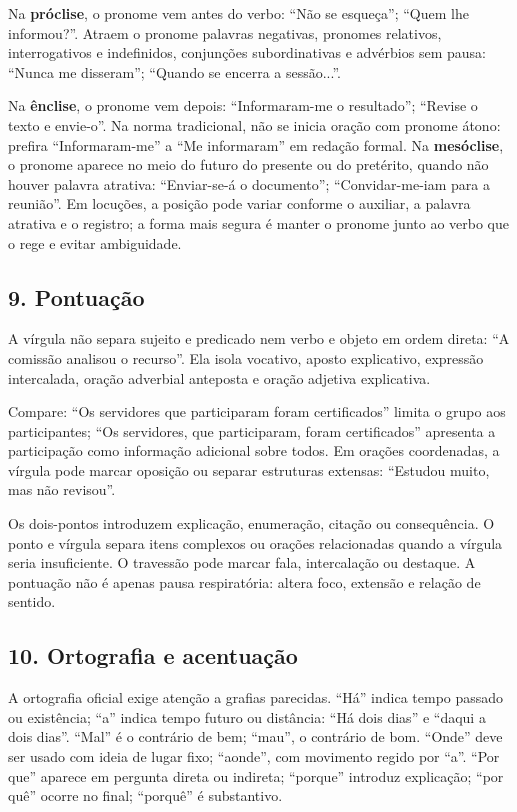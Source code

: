 \documentclass[11pt,a4paper]{article}
\begin{document}
Na \textbf{próclise}, o pronome vem antes do verbo: “Não se esqueça”; “Quem lhe informou?”. Atraem o pronome palavras negativas, pronomes relativos, interrogativos e indefinidos, conjunções subordinativas e advérbios sem pausa: “Nunca me disseram”; “Quando se encerra a sessão...”.

Na \textbf{ênclise}, o pronome vem depois: “Informaram-me o resultado”; “Revise o texto e envie-o”. Na norma tradicional, não se inicia oração com pronome átono: prefira “Informaram-me” a “Me informaram” em redação formal. Na \textbf{mesóclise}, o pronome aparece no meio do futuro do presente ou do pretérito, quando não houver palavra atrativa: “Enviar-se-á o documento”; “Convidar-me-iam para a reunião”. Em locuções, a posição pode variar conforme o auxiliar, a palavra atrativa e o registro; a forma mais segura é manter o pronome junto ao verbo que o rege e evitar ambiguidade.

\subsection*{9. Pontuação}

A vírgula não separa sujeito e predicado nem verbo e objeto em ordem direta: “A comissão analisou o recurso”. Ela isola vocativo, aposto explicativo, expressão intercalada, oração adverbial anteposta e oração adjetiva explicativa.

Compare: “Os servidores que participaram foram certificados” limita o grupo aos participantes; “Os servidores, que participaram, foram certificados” apresenta a participação como informação adicional sobre todos. Em orações coordenadas, a vírgula pode marcar oposição ou separar estruturas extensas: “Estudou muito, mas não revisou”.

Os dois-pontos introduzem explicação, enumeração, citação ou consequência. O ponto e vírgula separa itens complexos ou orações relacionadas quando a vírgula seria insuficiente. O travessão pode marcar fala, intercalação ou destaque. A pontuação não é apenas pausa respiratória: altera foco, extensão e relação de sentido.

\subsection*{10. Ortografia e acentuação}

A ortografia oficial exige atenção a grafias parecidas. “Há” indica tempo passado ou existência; “a” indica tempo futuro ou distância: “Há dois dias” e “daqui a dois dias”. “Mal” é o contrário de bem; “mau”, o contrário de bom. “Onde” deve ser usado com ideia de lugar fixo; “aonde”, com movimento regido por “a”. “Por que” aparece em pergunta direta ou indireta; “porque” introduz explicação; “por quê” ocorre no final; “porquê” é substantivo.
\end{document}
